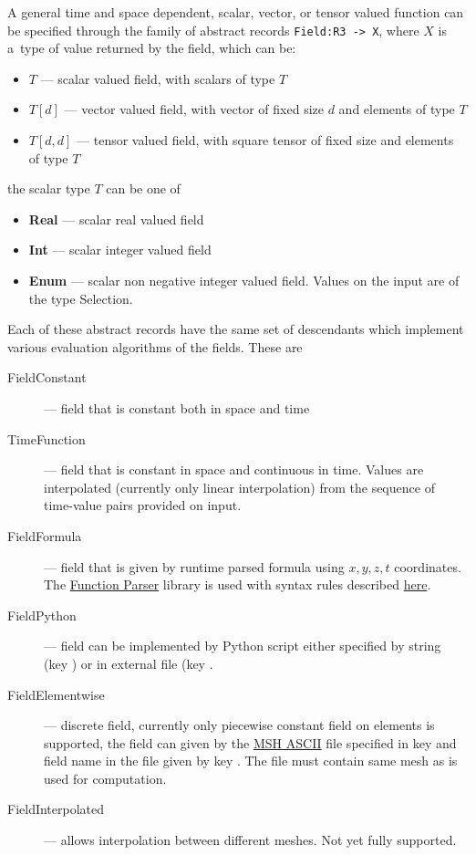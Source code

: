 A general time and space dependent, scalar, vector, or  tensor valued function can be specified through the family of abstract records 
\verb'Field:R3 -> X', where $X$ is a~type of value returned by the field, which can be:
\begin{itemize}
 \item $T$ --- scalar valued field, with scalars of type $T$
 \item $T[d]$ --- vector valued field, with vector of fixed size $d$ and elements of type $T$
 \item $T[d, d]$ --- tensor valued field, with square tensor of fixed size and elements of type $T$
\end{itemize}
the scalar type $T$ can be one of
\begin{itemize}
 \item {\bf Real} --- scalar real valued field
 \item {\bf Int}  --- scalar integer valued field
 \item {\bf Enum} --- scalar non negative integer valued field. Values on the input are of the type Selection.
\end{itemize}

Each of these abstract records have the same set of descendants which implement various evaluation algorithms of the fields. These are
\begin{description}
 \item[FieldConstant] --- field that is constant both in space and time
 \item[TimeFunction] --- field that is constant in space and continuous in time. Values are interpolated (currently only linear interpolation) from 
 the sequence of time-value pairs provided on input.
 \item[FieldFormula] --- field that is given by runtime parsed formula using $x,y,z,t$ coordinates. The \href{http://warp.povusers.org/FunctionParser/}{Function Parser} library is used
 with syntax rules described \href{http://warp.povusers.org/FunctionParser/fparser.html#literals}{here}.
 \item[FieldPython] --- field can be implemented by Python script either specified by string (key ) 
 or in external file (key . 
 \item[FieldElementwise] --- discrete field, currently only piecewise constant field on elements is supported, the field can given by 
 the \href{http://geuz.org/gmsh/doc/texinfo/gmsh.html#MSH-ASCII-file-format}{MSH ASCII} file specified in key  and field name in the file given 
 by key . The file must contain same mesh as is used for computation.
 \item[FieldInterpolated] --- allows interpolation between different meshes. Not yet fully supported.
\end{description}


